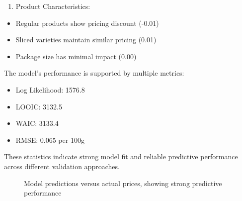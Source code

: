\documentclass[
  letterpaper,
  DIV=11,
  numbers=noendperiod]{scrartcl}
\providecommand{\tightlist}{%
  \setlength{\itemsep}{0pt}\setlength{\parskip}{0pt}}\usepackage{longtable,booktabs,array}
\begin{document}
\begin{enumerate}
\def\labelenumi{\arabic{enumi}.}
\setcounter{enumi}{2}
\tightlist
\item
  Product Characteristics:
\end{enumerate}

\begin{itemize}
\item
  Regular products show pricing discount (-0.01)
\item
  Sliced varieties maintain similar pricing (0.01)
\item
  Package size has minimal impact (0.00)
\end{itemize}

The model's performance is supported by multiple metrics:

\begin{itemize}
\item
  Log Likelihood: 1576.8
\item
  LOOIC: 3132.5
\item
  WAIC: 3133.4
\item
  RMSE: 0.065 per 100g
\end{itemize}

These statistics indicate strong model fit and reliable predictive
performance across different validation approaches.

\begin{figure}[H]


\caption{\label{fig-predictions}Model predictions versus actual prices,
showing strong predictive performance}

\end{figure}%
\end{document}
